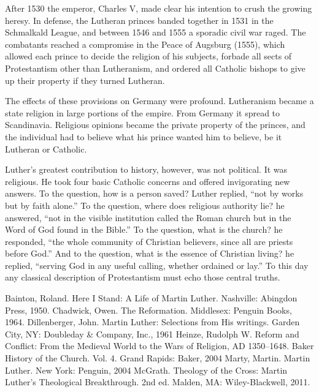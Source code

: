 After 1530 the emperor, Charles V, made clear his intention to crush the growing heresy. In defense,
the Lutheran princes banded together in 1531 in the Schmalkald League, and between 1546 and 1555 a
sporadic civil war raged. The combatants reached a compromise in the Peace of Augsburg (1555), which
allowed each prince to decide the religion of his subjects, forbade all sects of Protestantism other
than Lutheranism, and ordered all Catholic bishops to give up their property if they turned
Lutheran.

The effects of these provisions on Germany were profound. Lutheranism became a state religion in
large portions of the empire. From Germany it spread to Scandinavia. Religious opinions became the
private property of the princes, and the individual had to believe what his prince wanted him to
believe, be it Lutheran or Catholic.

Luther’s greatest contribution to history, however, was not political. It was religious. He took
four basic Catholic concerns and offered invigorating new answers. To the question, how is a person
saved? Luther replied, “not by works but by faith alone.” To the question, where does religious
authority lie? he answered, “not in the visible institution called the Roman church but in the Word
of God found in the Bible.” To the question, what is the church? he responded, “the whole community
of Christian believers, since all are priests before God.” And to the question, what is the essence
of Christian living? he replied, “serving God in any useful calling, whether ordained or lay.” To
this day any classical description of Protestantism must echo those central truths.

\begin{readinglist}
\entry Bainton, Roland. Here I Stand: A Life of Martin Luther. Nashville: Abingdon Press, 1950.
\entry Chadwick, Owen. The Reformation. Middlesex: Penguin Books, 1964.
\entry Dillenberger, John. Martin Luther: Selections from His writings. Garden City, NY: Doubleday
  \& Company, Inc., 1961
\entry Heinze, Rudolph W. Reform and Conflict: From the Medieval World to the Wars of Religion, AD
  1350–1648. Baker History of the Church. Vol. 4. Grand Rapids: Baker, 2004
\entry Marty, Martin. Martin Luther. New York: Penguin, 2004
\entry *McGrath. Theology of the Cross: Martin Luther’s Theological Breakthrough. 2nd ed. Malden,
  MA: Wiley-Blackwell, 2011.
\end{readinglist}
